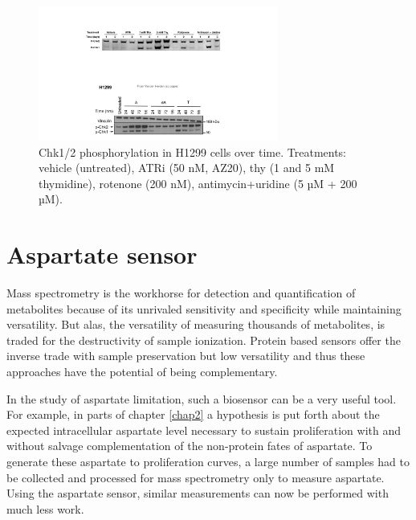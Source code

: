 \begin{figure}
    \centering
    \includegraphics[width=0.7\textwidth]{figures/chap6/P_Chk_wstrn.pdf}
    \caption[Chk1/2 phosphorylation after rotenone/antimycin treatment.]{
    Chk1/2 phosphorylation in H1299 cells over time.
    Treatments: vehicle (untreated), ATRi (50 nM, AZ20), thy (1 and 5 mM thymidine), rotenone (200 nM), antimycin+uridine (5 µM + 200 µM).
    }
    \label{fig:ch6:P_Chk_wstrn}
\end{figure}




\section{Aspartate sensor}
Mass spectrometry is the workhorse for detection and quantification of metabolites because of its unrivaled sensitivity and specificity while maintaining versatility.
But alas, the versatility of measuring thousands of metabolites, is traded for the destructivity of sample ionization.
Protein based sensors offer the inverse trade with sample preservation but low versatility and thus these approaches have the potential of being complementary.

In the study of aspartate limitation, such a biosensor can be a very useful tool.
For example, in parts of chapter \ref{chap2} a hypothesis is put forth about the expected intracellular aspartate level necessary to sustain proliferation with and without salvage complementation of the non-protein fates of aspartate.
To generate these aspartate to proliferation curves, a large number of samples had to be collected and processed for mass spectrometry only to measure aspartate.
Using the aspartate sensor, similar measurements can now be performed with much less work.

